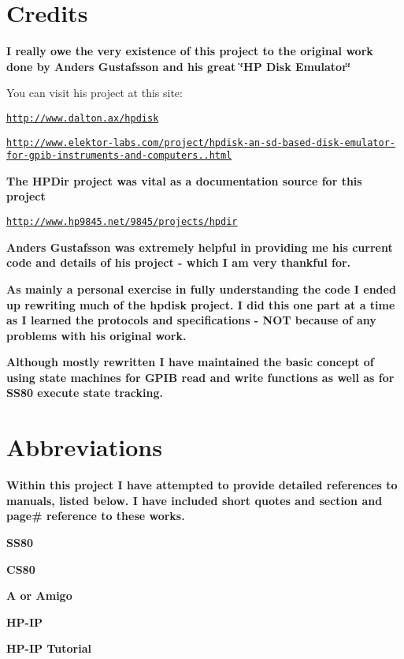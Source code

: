 \section*{Credits}

{\bfseries I really owe the very existence of this project to the original work done by Anders Gustafsson and his great \char`\"{}\+H\+P Disk Emulator\char`\"{} }
\begin{DoxyItemize}
\item You can visit his project at this site\+:
\begin{DoxyItemize}
\item \href{http://www.dalton.ax/hpdisk}{\tt http\+://www.\+dalton.\+ax/hpdisk}
\item \href{http://www.elektor-labs.com/project/hpdisk-an-sd-based-disk-emulator-for-gpib-instruments-and-computers.13693.html}{\tt http\+://www.\+elektor-\/labs.\+com/project/hpdisk-\/an-\/sd-\/based-\/disk-\/emulator-\/for-\/gpib-\/instruments-\/and-\/computers..\+html}
\end{DoxyItemize}
\end{DoxyItemize}

{\bfseries  The H\+P\+Dir project was vital as a documentation source for this project
\begin{DoxyItemize}
\item \href{http://www.hp9845.net/9845/projects/hpdir}{\tt http\+://www.\+hp9845.\+net/9845/projects/hpdir}
\end{DoxyItemize}}

{\bfseries  {\bfseries Anders Gustafsson was extremely helpful in providing me his current code and details of his project -\/ which I am very thankful for.}}

{\bfseries  As mainly a personal exercise in fully understanding the code I ended up rewriting much of the hpdisk project. I did this one part at a time as I learned the protocols and specifications -\/ N\+OT because of any problems with his original work.}

{\bfseries  Although mostly rewritten I have maintained the basic concept of using state machines for G\+P\+IB read and write functions as well as for S\+S80 execute state tracking.}

{\bfseries 

 \section*{Abbreviations}}

{\bfseries  Within this project I have attempted to provide detailed references to manuals, listed below. I have included short quotes and section and page\# reference to these works.
\begin{DoxyItemize}
\item {\bfseries S\+S80}
\item {\bfseries C\+S80}
\item {\bfseries A or Amigo}
\item {\bfseries H\+P-\/\+IP}
\item {\bfseries H\+P-\/\+IP Tutorial}
\end{DoxyItemize}}

